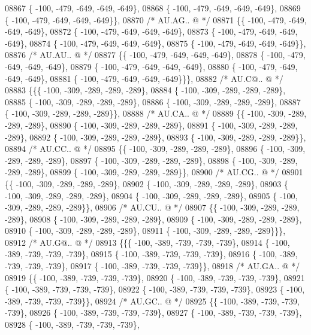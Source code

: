 \begin{DoxyCode}
08867 \{ -100, -479, -649, -649, -649\},
08868 \{ -100, -479, -649, -649, -649\},
08869 \{ -100, -479, -649, -649, -649\}\},
08870 \textcolor{comment}{/* AU.AG.. @ */}
08871 \{\{ -100, -479, -649, -649, -649\},
08872 \{ -100, -479, -649, -649, -649\},
08873 \{ -100, -479, -649, -649, -649\},
08874 \{ -100, -479, -649, -649, -649\},
08875 \{ -100, -479, -649, -649, -649\}\},
08876 \textcolor{comment}{/* AU.AU.. @ */}
08877 \{\{ -100, -479, -649, -649, -649\},
08878 \{ -100, -479, -649, -649, -649\},
08879 \{ -100, -479, -649, -649, -649\},
08880 \{ -100, -479, -649, -649, -649\},
08881 \{ -100, -479, -649, -649, -649\}\}\},
08882 \textcolor{comment}{/* AU.C@.. @ */}
08883 \{\{\{ -100, -309, -289, -289, -289\},
08884 \{ -100, -309, -289, -289, -289\},
08885 \{ -100, -309, -289, -289, -289\},
08886 \{ -100, -309, -289, -289, -289\},
08887 \{ -100, -309, -289, -289, -289\}\},
08888 \textcolor{comment}{/* AU.CA.. @ */}
08889 \{\{ -100, -309, -289, -289, -289\},
08890 \{ -100, -309, -289, -289, -289\},
08891 \{ -100, -309, -289, -289, -289\},
08892 \{ -100, -309, -289, -289, -289\},
08893 \{ -100, -309, -289, -289, -289\}\},
08894 \textcolor{comment}{/* AU.CC.. @ */}
08895 \{\{ -100, -309, -289, -289, -289\},
08896 \{ -100, -309, -289, -289, -289\},
08897 \{ -100, -309, -289, -289, -289\},
08898 \{ -100, -309, -289, -289, -289\},
08899 \{ -100, -309, -289, -289, -289\}\},
08900 \textcolor{comment}{/* AU.CG.. @ */}
08901 \{\{ -100, -309, -289, -289, -289\},
08902 \{ -100, -309, -289, -289, -289\},
08903 \{ -100, -309, -289, -289, -289\},
08904 \{ -100, -309, -289, -289, -289\},
08905 \{ -100, -309, -289, -289, -289\}\},
08906 \textcolor{comment}{/* AU.CU.. @ */}
08907 \{\{ -100, -309, -289, -289, -289\},
08908 \{ -100, -309, -289, -289, -289\},
08909 \{ -100, -309, -289, -289, -289\},
08910 \{ -100, -309, -289, -289, -289\},
08911 \{ -100, -309, -289, -289, -289\}\}\},
08912 \textcolor{comment}{/* AU.G@.. @ */}
08913 \{\{\{ -100, -389, -739, -739, -739\},
08914 \{ -100, -389, -739, -739, -739\},
08915 \{ -100, -389, -739, -739, -739\},
08916 \{ -100, -389, -739, -739, -739\},
08917 \{ -100, -389, -739, -739, -739\}\},
08918 \textcolor{comment}{/* AU.GA.. @ */}
08919 \{\{ -100, -389, -739, -739, -739\},
08920 \{ -100, -389, -739, -739, -739\},
08921 \{ -100, -389, -739, -739, -739\},
08922 \{ -100, -389, -739, -739, -739\},
08923 \{ -100, -389, -739, -739, -739\}\},
08924 \textcolor{comment}{/* AU.GC.. @ */}
08925 \{\{ -100, -389, -739, -739, -739\},
08926 \{ -100, -389, -739, -739, -739\},
08927 \{ -100, -389, -739, -739, -739\},
08928 \{ -100, -389, -739, -739, -739\},

\end{DoxyCode}
